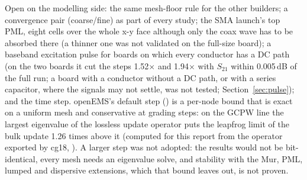 Open on the modelling side: the same mesh-floor rule for the other builders; a convergence pair (coarse/fine) as part
of every study; the SMA launch's top PML, eight cells over the whole x-y face although only the coax wave has to be
absorbed there (a thinner one was not validated on the full-size board); a baseband excitation pulse for boards on
which every conductor has a DC path (on the two boards it cut the steps 1.52$\times$ and 1.94$\times$ with $S_{21}$
within 0.005\,dB of the full run; a board with a conductor without a DC path, or with a series capacitor, where the
signals may not settle, was not tested; Section~\ref{sec:pulse}); and the time step. openEMS's default step
() is a per-node bound that is exact on a uniform mesh and conservative at grading steps: on
the GCPW line the largest eigenvalue of the lossless update operator puts the leapfrog limit of the bulk update 1.26
times above it (computed for this report from the operator exported by cg18,
). A larger step was not adopted: the results would not be
bit-identical, every mesh needs an eigenvalue solve, and stability with the Mur, PML, lumped and dispersive
extensions, which that bound leaves out, is not proven.

